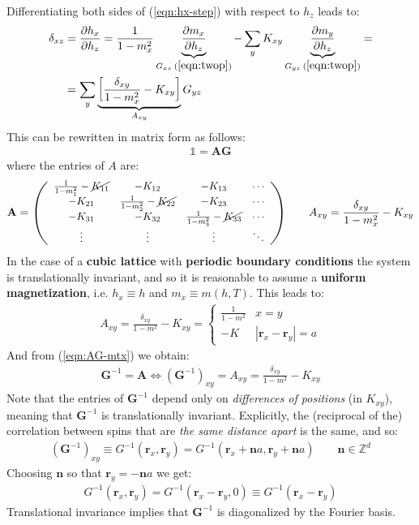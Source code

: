 \documentclass[../../main.tex]{subfiles}
\begin{document}
Differentiating both sides of (\ref{eqn:hx-step}) with respect to $h_z$ leads to:
\begin{align*}
\delta_{xz} &= \pdv{h_x}{h_z} = \frac{1}{1-m_x^2} \underbrace{\pdv{m_x}{h_z}}_{G_{xz} \> (\ref{eqn:twop})} - \sum_y K_{xy} \underbrace{\pdv{m_y}{h_z}}_{G_{yz}\>(\ref{eqn:twop})} =\\
&= \sum_y \underbrace{\left[\frac{\delta_{xy}}{1-m_x^2} - K_{xy} \right]}_{A_{xy}} G_{yz}
\end{align*}
This can be rewritten in matrix form as follows:
\begin{align}\label{eqn:AG-mtx}
    \mathbb{1} = \textbf{A} \textbf{G}
\end{align}
where the entries of $A$ are:
\begin{align*}
    \textbf{A}  = \resizebox{8cm}{!}{$\left(\begin{array}{cccc}
        \frac{1}{1-m_1^2}  - \cancel{K_{11}} & -K_{12} & -K_{13} & \cdots \\ 
        -K_{21} & \frac{1}{1-m_2^2}  - \cancel{K_{22}} & -K_{23} & \cdots \\ 
        -K_{31} & -K_{32} & \frac{1}{1-m_3^2}  - \cancel{K_{33}} & \cdots \\ 
        \vdots & \vdots & \vdots & \ddots
        \end{array}\right)$} \qquad A_{xy} = \frac{\delta_{xy}}{1-m_x^2} - K_{xy} 
\end{align*}
In the case of a \textbf{cubic lattice} with \textbf{periodic boundary conditions} the system is translationally invariant, and so it is reasonable to assume a \textbf{uniform magnetization}, i.e. $h_x \equiv h$ and $m_x \equiv m(h,T)$. This leads to:
\begin{align*}
    A_{xy} = \frac{\delta_{xy}}{1-m^2} - K_{xy} = \begin{cases}
        \frac{1}{1-m^2} & x=y\\
        -K & |\bm{r}_x-\bm{r}_y| = a 
    \end{cases} 
\end{align*}
And from (\ref{eqn:AG-mtx}) we obtain:
\begin{align*}
    \textbf{G}^{-1} = \textbf{A}  \Leftrightarrow (\textbf{G}^{-1})_{xy} = A_{xy} = \frac{\delta_{xy}}{1-m^2} - K_{xy} 
\end{align*}
Note that the entries of $\textbf{G}^{-1}$ depend only on \textit{differences of positions} (in $K_{xy}$), meaning that $\textbf{G}^{-1}$ is translationally invariant. Explicitly, the (reciprocal of the) correlation between spins that are \textit{the same distance apart} is the same, and so:
\begin{align*}
    (\textbf{G}^{-1})_{xy} \equiv G^{-1}(\bm{r}_x, \bm{r}_y) = G^{-1}(\bm{r}_x + \bm{n}a, \bm{r}_y + \bm{n}a) \qquad \bm{n} \in \mathbb{Z}^d
\end{align*}  
Choosing $\bm{n}$ so that $\bm{r}_y = -\bm{n}a$ we get:
\begin{align}\label{eqn:corr_translational_invariance}
    G^{-1}(\bm{r}_x, \bm{r}_y) = G^{-1}(\bm{r}_x-\bm{r}_y,0) \equiv G^{-1}(\bm{r}_x - \bm{r}_y)
\end{align}
Translational invariance implies that $\textbf{G}^{-1}$ is diagonalized by the Fourier basis. 
\end{document}
